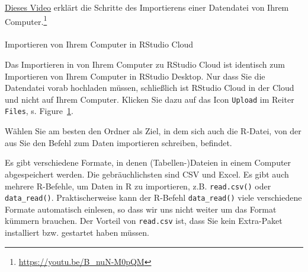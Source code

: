 \documentclass[
  letterpaper,
  DIV=11,
  numbers=noendperiod]{scrartcl}
\makeatletter
\let\oldparagraph\paragraph
\renewcommand{\paragraph}{
    \@ifstar
      \xxxParagraphStar
      \xxxParagraphNoStar
  }
\newcommand{\xxxParagraphStar}[1]{\oldparagraph*{#1}\mbox{}}
\newcommand{\xxxParagraphNoStar}[1]{\oldparagraph{#1}\mbox{}}
\theoremstyle{definition}
\theoremstyle{definition}
\theoremstyle{definition}
\theoremstyle{remark}
\makeatother
\begin{document}
\href{https://youtu.be/B_nuN-M0pQM}{Dieses Video} erklärt die Schritte
des Importierens einer Datendatei von Ihrem Computer.\footnote{\url{https://youtu.be/B_nuN-M0pQM}}

\paragraph{Importieren von Ihrem Computer in RStudio
Cloud}\label{importieren-von-ihrem-computer-in-rstudio-cloud}

Das Importieren in von Ihrem Computer zu RStudio Cloud ist identisch zum
Importieren von Ihrem Computer in RStudio Desktop. Nur dass Sie die
Datendatei vorab hochladen müssen, schließlich ist RStudio Cloud in der
Cloud und nicht auf Ihrem Computer. Klicken Sie dazu auf das Icon
\texttt{Upload} im Reiter \texttt{Files}, s.
Figure~\ref{fig-upload-to-posit-cloud}.

\begin{figure}


\caption{\label{fig-upload-to-posit-cloud}}

\end{figure}%

Wählen Sie am besten den Ordner als Ziel, in dem sich auch die R-Datei,
von der aus Sie den Befehl zum Daten importieren schreiben, befindet.

\begin{tcolorbox}[enhanced jigsaw, coltitle=black, colframe=quarto-callout-note-color-frame, opacityback=0, toprule=.15mm, opacitybacktitle=0.6, arc=.35mm, titlerule=0mm, toptitle=1mm, title=\textcolor{quarto-callout-note-color}{\faInfo}\hspace{0.5em}{Note}, bottomtitle=1mm, leftrule=.75mm, breakable, rightrule=.15mm, colbacktitle=quarto-callout-note-color!10!white, bottomrule=.15mm, colback=white, left=2mm]

Es gibt verschiedene Formate, in denen (Tabellen-)Dateien in einem
Computer abgespeichert werden. Die gebräuchlichsten sind CSV und Excel.
Es gibt auch mehrere R-Befehle, um Daten in R zu importieren, z.B.
\texttt{read.csv()} oder \texttt{data\_read()}. Praktischerweise kann
der R-Befehl \texttt{data\_read()} viele verschiedene Formate
automatisch einlesen, so dass wir uns nicht weiter um das Format kümmern
brauchen. Der Vorteil von \texttt{read.csv} ist, dass Sie kein
Extra-Paket installiert bzw. gestartet haben müssen.

\end{tcolorbox}
\end{document}
